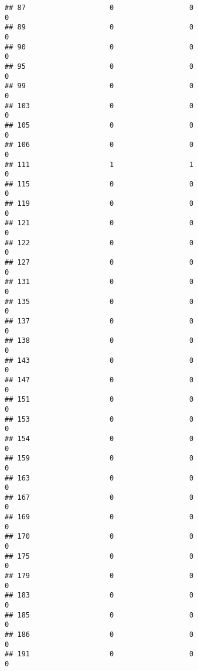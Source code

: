 \documentclass[
]{article}
\begin{document}
\begin{verbatim}
## 87                    0                  0                              0
## 89                    0                  0                              0
## 90                    0                  0                              0
## 95                    0                  0                              0
## 99                    0                  0                              0
## 103                   0                  0                              0
## 105                   0                  0                              0
## 106                   0                  0                              0
## 111                   1                  1                              0
## 115                   0                  0                              0
## 119                   0                  0                              0
## 121                   0                  0                              0
## 122                   0                  0                              0
## 127                   0                  0                              0
## 131                   0                  0                              0
## 135                   0                  0                              0
## 137                   0                  0                              0
## 138                   0                  0                              0
## 143                   0                  0                              0
## 147                   0                  0                              0
## 151                   0                  0                              0
## 153                   0                  0                              0
## 154                   0                  0                              0
## 159                   0                  0                              0
## 163                   0                  0                              0
## 167                   0                  0                              0
## 169                   0                  0                              0
## 170                   0                  0                              0
## 175                   0                  0                              0
## 179                   0                  0                              0
## 183                   0                  0                              0
## 185                   0                  0                              0
## 186                   0                  0                              0
## 191                   0                  0                              0

\end{verbatim}
\end{document}
